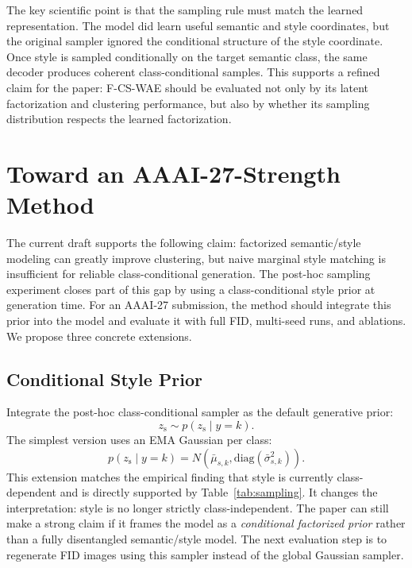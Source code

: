 \documentclass[10pt]{article}
\newcommand{\ours}{F-CS-WAE}
\newcommand{\zs}{z_{\mathrm{s}}}
\begin{document}
The key scientific point is that the sampling rule must match the learned representation. The model did learn useful semantic and style coordinates, but the original sampler ignored the conditional structure of the style coordinate. Once style is sampled conditionally on the target semantic class, the same decoder produces coherent class-conditional samples. This supports a refined claim for the paper: \ours{} should be evaluated not only by its latent factorization and clustering performance, but also by whether its sampling distribution respects the learned factorization.

\section{Toward an AAAI-27-Strength Method}
\label{sec:future}

The current draft supports the following claim: factorized semantic/style modeling can greatly improve clustering, but naive marginal style matching is insufficient for reliable class-conditional generation. The post-hoc sampling experiment closes part of this gap by using a class-conditional style prior at generation time. For an AAAI-27 submission, the method should integrate this prior into the model and evaluate it with full FID, multi-seed runs, and ablations. We propose three concrete extensions.

\subsection{Conditional Style Prior}

Integrate the post-hoc class-conditional sampler as the default generative prior:
\begin{equation}
    \zs \sim p(\zs\mid y=k).
\end{equation}
The simplest version uses an EMA Gaussian per class:
\begin{equation}
    p(\zs\mid y=k)=N(\bar{\mu}_{s,k},\mathrm{diag}(\bar{\sigma}_{s,k}^2)).
\end{equation}
This extension matches the empirical finding that style is currently class-dependent and is directly supported by Table~\ref{tab:sampling}. It changes the interpretation: style is no longer strictly class-independent. The paper can still make a strong claim if it frames the model as a \emph{conditional factorized prior} rather than a fully disentangled semantic/style model. The next evaluation step is to regenerate FID images using this sampler instead of the global Gaussian sampler.
\end{document}
